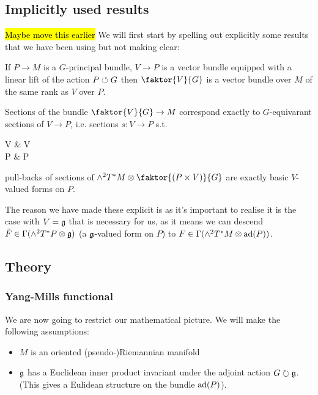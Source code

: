 \documentclass{article}
\begin{document}
\subsection{Implicitly used results}

\hl{Maybe move this earlier}
We will first start by spelling out explicitly some results that we have been using but not making clear:

\begin{lemma}
	If $P \to M$ is a $G$-principal bundle, $V \to P$ is a vector bundle equipped with a linear lift of the action $P \circlearrowleft G$ then $\faktor{V}{G}$ is a vector bundle over $M$ of the same rank as $V$ over $P$. 
\end{lemma}

\begin{lemma}
	Sections of the bundle $\faktor{V}{G} \to M$ correspond exactly to $G$-equivarant sections of $V \to P$, i.e. sections $s:V\to P$ s.t. 
	\begin{tkz}
	V \arrow[r,"g"] \arrow[d] & V \arrow[d] \\ P \arrow[r,"g"'] \arrow[u,bend left=20,"s"] & P \arrow[u,bend right=20, "s"']
	\end{tkz} 
\end{lemma}

\begin{lemma}
	pull-backs of sections of $\wedge^2 T^\ast M \otimes \faktor{(P \times V)}{G}$ are exactly basic $V$-valued forms on $P$. 
\end{lemma}

The reason we have made these explicit is as it's important to realise it is the case with $V= \mathfrak{g}$ that is necessary for us, as it means we can descend $\tilde{F} \in \Gamma(\wedge^2 T^\ast P \otimes \mathfrak{g})$ (a $\mathfrak{g}$-valued form on $P$) to $F\in \Gamma(\wedge^2 T^\ast M \otimes \operatorname{ad}(P))$. 


\subsection{Theory}
\subsubsection{Yang-Mills functional}
We are now going to restrict our mathematical picture. We will make the following assumptions:
\begin{itemize}
	\item $M$ is an oriented (pseudo-)Riemannian manifold
	\item $\mathfrak{g}$ has a Euclidean inner product invariant under the adjoint action $G \circlearrowright \mathfrak{g}$. (This gives a Eulidean structure on the bundle $\operatorname{ad}(P)$). 
\end{itemize}
\end{document}

